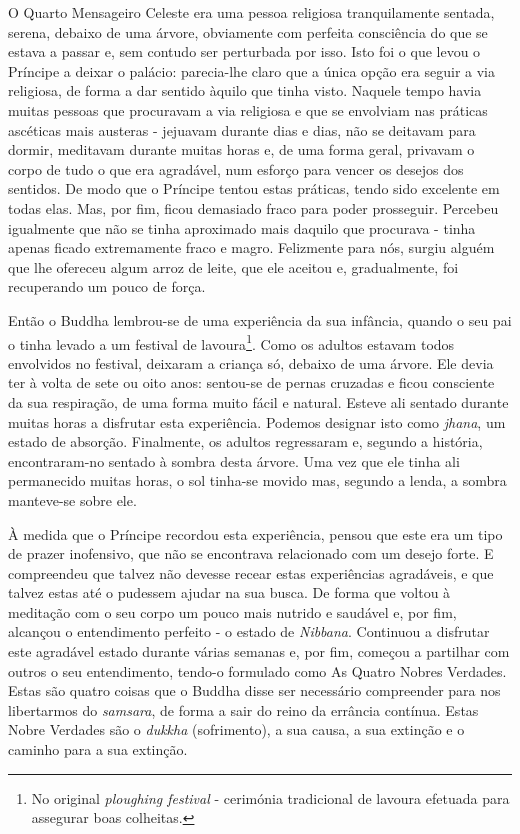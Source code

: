 O Quarto Mensageiro Celeste era uma pessoa religiosa tranquilamente
sentada, serena, debaixo de uma árvore, obviamente com perfeita
consciência do que se estava a passar e, sem contudo ser perturbada por
isso. Isto foi o que levou o Príncipe a deixar o palácio: parecia-lhe
claro que a única opção era seguir a via religiosa, de forma a dar
sentido àquilo que tinha visto. Naquele tempo havia muitas pessoas que
procuravam a via religiosa e que se envolviam nas práticas ascéticas
mais austeras - jejuavam durante dias e dias, não se deitavam para
dormir, meditavam durante muitas horas e, de uma forma geral, privavam o
corpo de tudo o que era agradável, num esforço para vencer os desejos
dos sentidos. De modo que o Príncipe tentou estas práticas, tendo sido
excelente em todas elas. Mas, por fim, ficou demasiado fraco para poder
prosseguir. Percebeu igualmente que não se tinha aproximado mais daquilo
que procurava - tinha apenas ficado extremamente fraco e magro.
Felizmente para nós, surgiu alguém que lhe ofereceu algum arroz de
leite, que ele aceitou e, gradualmente, foi recuperando um pouco de
força.

Então o Buddha lembrou-se de uma experiência da sua infância, quando o
seu pai o tinha levado a um festival de lavoura\footnote{No original
  \emph{ploughing festival} - cerimónia tradicional de lavoura efetuada
  para assegurar boas colheitas.}. Como os adultos estavam todos
envolvidos no festival, deixaram a criança só, debaixo de uma árvore.
Ele devia ter à volta de sete ou oito anos: sentou-se de pernas cruzadas
e ficou consciente da sua respiração, de uma forma muito fácil e
natural. Esteve ali sentado durante muitas horas a disfrutar esta
experiência. Podemos designar isto como \emph{jhana}, um estado de
absorção. Finalmente, os adultos regressaram e, segundo a história,
encontraram-no sentado à sombra desta árvore. Uma vez que ele tinha ali
permanecido muitas horas, o sol tinha-se movido mas, segundo a lenda, a
sombra manteve-se sobre ele.

À medida que o Príncipe recordou esta experiência, pensou que este era
um tipo de prazer inofensivo, que não se encontrava relacionado com um
desejo forte. E compreendeu que talvez não devesse recear estas
experiências agradáveis, e que talvez estas até o pudessem ajudar na sua
busca. De forma que voltou à meditação com o seu corpo um pouco mais
nutrido e saudável e, por fim, alcançou o entendimento perfeito - o
estado de \emph{Nibbana}. Continuou a disfrutar este agradável estado
durante várias semanas e, por fim, começou a partilhar com outros o seu
entendimento, tendo-o formulado como As Quatro Nobres Verdades. Estas
são quatro coisas que o Buddha disse ser necessário compreender para nos
libertarmos do \emph{samsara}, de forma a sair do reino da errância
contínua. Estas Nobre Verdades são o \emph{dukkha} (sofrimento), a sua
causa, a sua extinção e o caminho para a sua extinção.

